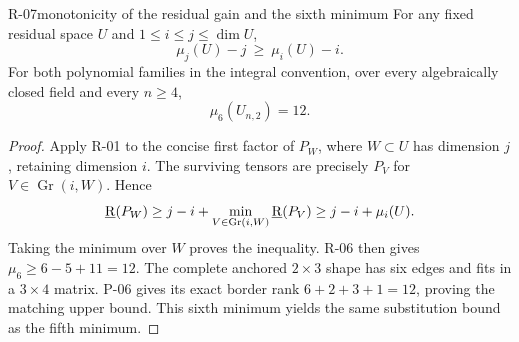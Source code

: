 \begin{finding}{R-07}{monotonicity of the residual gain and the sixth minimum}
For any fixed residual space $U$ and
$1\leq i\leq j\leq\dim U$,
\[
 \mu_j(U)-j\ \geq\ \mu_i(U)-i.
\]
For both polynomial families in the integral convention,
over every algebraically closed field and every $n\geq4$,
\[
 \mu_6(U_{n,2})=12.
\]
\end{finding}
\begin{proof}
Apply R-01 to the concise first factor of $P_W$, where
$W\subset U$ has dimension $j$, retaining dimension $i$.
The surviving tensors are precisely $P_V$ for
$V\in\operatorname{Gr}(i,W)$. Hence
\[
 \underline{\mathrm R}(P_W)\geq j-i+
 \min_{V\in\operatorname{Gr}(i,W)}\underline{\mathrm R}(P_V)
 \geq j-i+\mu_i(U).
\]
Taking the minimum over $W$ proves the inequality.
R-06 then gives $\mu_6\geq6-5+11=12$.
The complete anchored $2\times3$ shape has six edges
and fits in a $3\times4$ matrix. P-06 gives its exact
border rank $6+2+3+1=12$, proving the matching upper
bound. This sixth minimum yields the same substitution
bound as the fifth minimum.
\end{proof}
